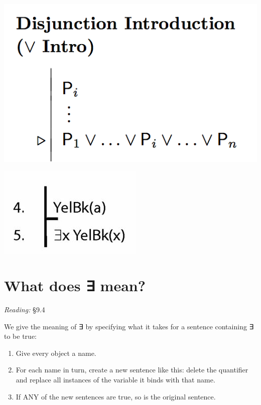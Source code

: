 \documentclass[12pt]{extarticle}
\begin{document}
\begin{multicols*}{3}
\begin{center}
\includegraphics[scale=0.3]{img/rule_disjunction_intro.png}
\end{center}
\begin{center}
\includegraphics[scale=0.3]{img/unit_801_proof.png}
\end{center}
 
 
\section{What does ∃ mean?}
 
\emph{Reading:} §9.4
 
We give the meaning of ∃ by specifying what it takes for a sentence containing ∃ to be true:
 
\begin{enumerate}
 
\item Give every object a name.
 
\item For each name in turn, create a new sentence like this: delete the quantifier and replace all instances of the variable it binds with that name.
 
\item If ANY of the new sentences are true, so is the original sentence.
 

\end{enumerate}
\end{multicols*}
\end{document}
